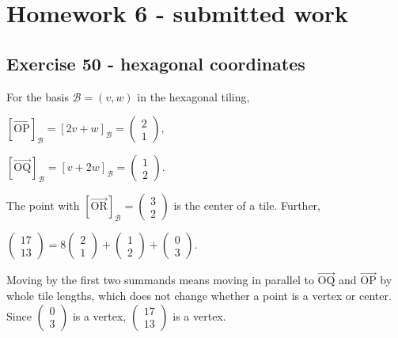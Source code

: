 \section{Homework 6 - submitted work}

\subsection{Exercise 50 - hexagonal coordinates}

For the basis \(\mathcal{B} = \left( {v,w} \right)\) in the hexagonal tiling,

\(\left\lbrack \overrightarrow{\text{OP}} \right\rbrack_{\mathcal{B}} = \left\lbrack {2v + w} \right\rbrack_{\mathcal{B}} = \begin{pmatrix}
2 \\
1
\end{pmatrix},\)

\(\left\lbrack \overrightarrow{\text{OQ}} \right\rbrack_{\mathcal{B}} = \left\lbrack {v + 2w} \right\rbrack_{\mathcal{B}} = \begin{pmatrix}
1 \\
2
\end{pmatrix}.\)

The point with \(\left\lbrack \overrightarrow{\text{OR}} \right\rbrack_{\mathcal{B}} = \begin{pmatrix}
3 \\
2
\end{pmatrix}\) is the center of a tile. Further,

\(\begin{pmatrix}
17 \\
13
\end{pmatrix} = 8\begin{pmatrix}
2 \\
1
\end{pmatrix} + \begin{pmatrix}
1 \\
2
\end{pmatrix} + \begin{pmatrix}
0 \\
3
\end{pmatrix}.\)

Moving by the first two summands means moving in parallel to \(\overrightarrow{\text{OQ}}\) and \(\overrightarrow{\text{OP}}\) by whole tile lengths, which does not change whether a point is a vertex or center. Since \(\begin{pmatrix}
0 \\
3
\end{pmatrix}\) is a vertex, \(\begin{pmatrix}
17 \\
13
\end{pmatrix}\) is a vertex.

